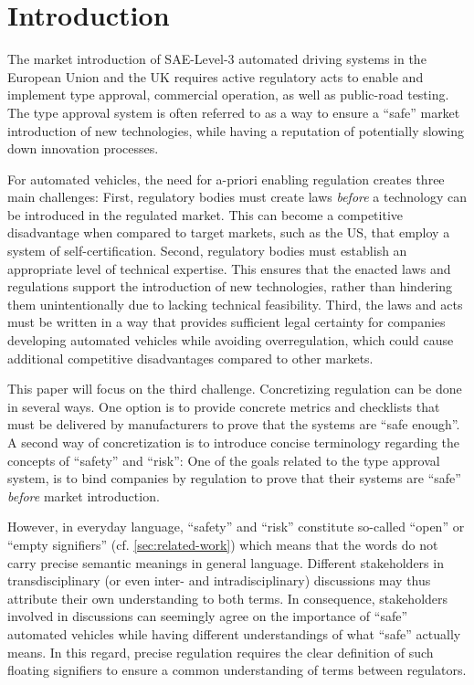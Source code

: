 \section{Introduction}
\label{sec:intro}
The market introduction of SAE-Level-3 automated driving systems in the European Union and the UK requires active regulatory acts to enable and implement type approval, commercial operation, as well as public-road testing.
The type approval system is often referred to as a way to ensure a ``safe'' market introduction of new technologies, while having a reputation of potentially slowing down innovation processes.

For automated vehicles, the need for a-priori enabling regulation creates three main challenges:
First, regulatory bodies must create laws \emph{before} a technology can be introduced in the regulated market.
This can become a competitive disadvantage when compared to target markets, such as the US, that employ a system of self-certification.
Second, regulatory bodies must establish an appropriate level of technical expertise.
This ensures that the enacted laws and regulations support the introduction of new technologies, rather than hindering them unintentionally due to lacking technical feasibility.
Third, the laws and acts must be written in a way that provides sufficient legal certainty for companies developing automated vehicles while avoiding overregulation, which could cause additional competitive disadvantages compared to other markets.

This paper will focus on the third challenge.
Concretizing regulation can be done in several ways.
One option is to provide concrete metrics and checklists that must be delivered by manufacturers to prove that the systems are ``safe enough''.
A second way of concretization is to introduce concise terminology regarding the concepts of ``safety'' and ``risk'':
One of the goals related to the type approval system, is to bind companies by regulation to prove that their systems are ``safe'' \emph{before} market introduction.

However, in everyday language, ``safety'' and ``risk'' constitute so-called ``open'' or ``empty signifiers'' \parencite{fleischer2023, buchanan2010} (cf. \cref{sec:related-work}) which means that the words do not carry precise semantic meanings in general language.
Different stakeholders in transdisciplinary (or even inter- and intradisciplinary) discussions may thus attribute their own understanding to both terms.
In consequence, stakeholders involved in discussions can seemingly agree on the importance of ``safe'' automated vehicles while having different understandings of what ``safe'' actually means.
In this regard, precise regulation requires the clear definition of such floating signifiers to ensure a common understanding of terms between regulators. 

